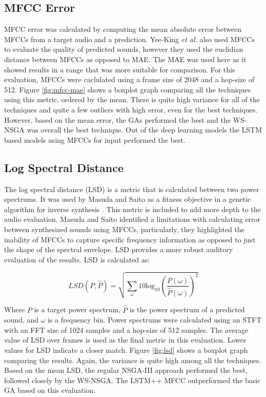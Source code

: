 \subsection{MFCC Error}
MFCC error was calculated by computing the mean absolute error between MFCCs from a target audio and a prediction. Yee-King \textit{et al.} \cite{yee2018automatic} also used MFCCs to evaluate the quality of predicted sounds, however they used the euclidian distance between MFCCs as opposed to MAE. The MAE was used here as it showed results in a range that was more suitable for comparison. For this evaluation, MFCCs were caclulated using a frame size of 2048 and a hop-size of 512. Figure \ref{fig:mfcc-mae} shows a boxplot graph comparing all the techniques using this metric, ordered by the mean. There is quite high variance for all of the techniques and quite a few outliers with high error, even for the best techniques. However, based on the mean error, the GAs performed the best and the WS-NSGA was overall the best technique. Out of the deep learning models the LSTM based models using MFCCs for input performed the best.

\subsection{Log Spectral Distance}
The log spectral distance (LSD) is a metric that is calculated between two power spectrums. It was used by Masuda and Saito as a fitness objective in a genetic algorithm for inverse synthesis \cite{masudo2021quality}. This metric is included to add more depth to the audio evaluation. Masuda and Saito identified a limitations with calculating error between synthesized sounds using MFCCs, particularly, they highlighted the inability of MFCCs to capture specific frequency information as opposed to just the shape of the spectral envelope. LSD provides a more robust auditory evaluation of the results. LSD is calculated as:

\begin{equation}
    LSD(P, \hat{P}) = \sqrt{\sum_{\omega}10\text{log}_{10}\left( \frac{P(\omega)}{\hat{P}(\omega)} \right)^2}
\end{equation}

Where $P$ is a target power spectrum, $\hat{P}$ is the power spectrum of a predicted sound, and $\omega$ is a frequency bin. Power spectrums were calculated using an STFT with an FFT size of 1024 samples and a hop-size of 512 samples. The average value of LSD over frames is used as the final metric in this evaluation. Lower values for LSD indicate a closer match. Figure \ref{fig:lsd} shows a boxplot graph comparing the results. Again, the variance is quite high among all the techniques. Based on the mean LSD, the regular NSGA-III approach performed the best, followed closely by the WS-NSGA. The LSTM++ MFCC outperformed the basic GA based on this evaluation.

